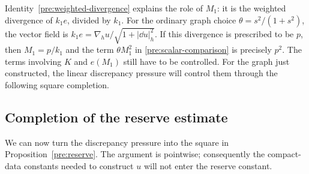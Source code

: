 Identity~\eqref{pre:weighted-divergence} explains the role of $M_1$:
it is the weighted divergence of $k_1e$, divided by $k_1$.
For the ordinary graph choice $\theta=s^2/(1+s^2)$, the vector field is
$k_1e=\nabla_hu/\sqrt{1+|\dd u|_h^2}$.
If this divergence is prescribed to be $p$, then $M_1=p/k_1$ and the
term $\theta M_1^2$ in \eqref{pre:scalar-comparison} is precisely $p^2$.
The terms involving $K$ and $e(M_1)$ still have to be controlled.
For the graph just constructed, the linear discrepancy pressure will
control them through the following square completion.

\subsection{Completion of the reserve estimate}

We can now turn the discrepancy pressure into the square in
Proposition~\ref{pre:reserve}. The argument is pointwise; consequently the
compact-data constants needed to construct $u$ will not enter the
reserve constant.


